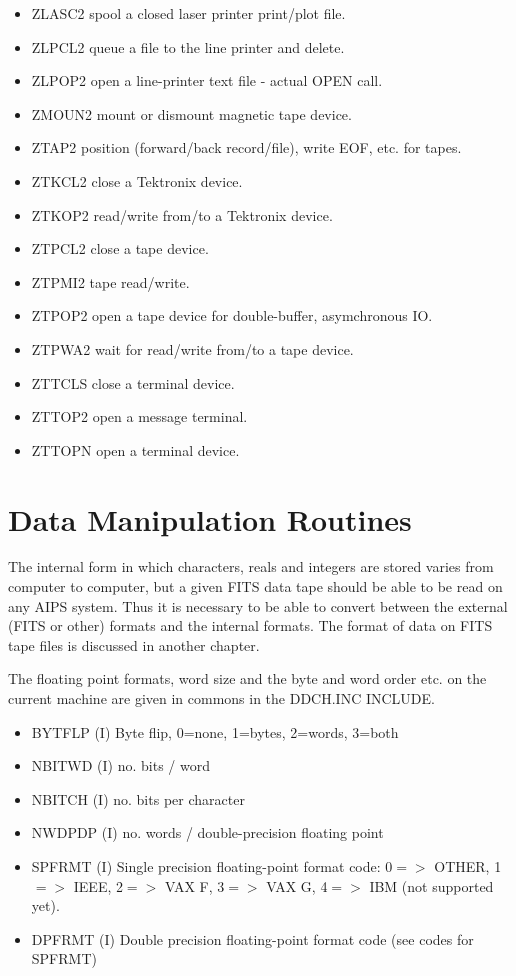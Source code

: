 \begin{itemize} %
\item ZLASC2  spool a closed laser printer print/plot
file.
\item ZLPCL2  queue a file to the line printer and
delete.
\item ZLPOP2  open a line-printer text file - actual
OPEN call.
\item ZMOUN2  mount or dismount magnetic tape device.
\item ZTAP2   position (forward/back record/file), write
EOF, etc. for tapes.
\item ZTKCL2  close a Tektronix device.
\item ZTKOP2  read/write from/to a Tektronix device.
\item ZTPCL2  close a tape device.
\item ZTPMI2  tape read/write.
\item ZTPOP2  open a tape device for double-buffer,
asymchronous IO.
\item ZTPWA2  wait for read/write from/to a tape device.
\item ZTTCLS  close a terminal device.
\item ZTTOP2  open a message terminal.
\item ZTTOPN  open a terminal device.
\end{itemize} %

\section{Data Manipulation Routines }

The internal form in which characters, reals and integers are stored
varies from computer to computer, but a given FITS data tape should
be able to be read on any AIPS system.  Thus it is necessary to be
able to convert between the external (FITS or other) formats and the
internal formats. The format of data on FITS tape files is discussed
in another chapter.

The floating point formats, word size and the byte and word order etc.
on the current machine are given in commons in the
DDCH.INC INCLUDE.
\begin{itemize}
\item BYTFLP  (I)    Byte flip, 0=none, 1=bytes, 2=words, 3=both
\item NBITWD  (I)    no. bits / word
\item NBITCH  (I)    no. bits per character
\item NWDPDP  (I)    no. words / double-precision floating point
\item SPFRMT  (I)    Single precision floating-point format code: 0$=>$
OTHER, 1$=>$ IEEE, 2$=>$ VAX F, 3$=>$ VAX G, 4$=>$ IBM (not
supported yet).
\item DPFRMT  (I)    Double precision floating-point format code (see
codes for SPFRMT)
\end{itemize}

